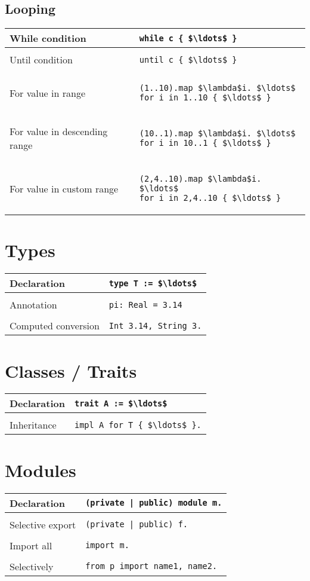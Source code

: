 \documentclass[a4paper,12pt]{article}
\makeatletter
\newcommand{\code}{\lstinline}
\newcommand{\br}{\\ [0.5em] \hline \\ [-0.5em]}
\newenvironment{data}
    {
        \begin{center}
        \begin{tabular*}{\textwidth}{ l@{\extracolsep{\fill}}l }
    }
    {
        \end{tabular*}
        \end{center}
    }
\makeatother
\begin{document}
\subsection{Looping}
\begin{data}
While condition &
    \code[mathescape=true]|while c { $\ldots$ }| \br
Until condition &
    \code[mathescape=true]|until c { $\ldots$ }| \br
For value in range &
    \begin{lstlisting}[mathescape=true]
(1..10).map $\lambda$i. $\ldots$
for i in 1..10 { $\ldots$ }
    \end{lstlisting} \br
For value in descending range &
    \begin{lstlisting}[mathescape=true]
(10..1).map $\lambda$i. $\ldots$
for i in 10..1 { $\ldots$ }
    \end{lstlisting} \br
For value in custom range &
    \begin{lstlisting}[mathescape=true]
(2,4..10).map $\lambda$i. $\ldots$
for i in 2,4..10 { $\ldots$ }
    \end{lstlisting}
\end{data}


\section{Types}
\begin{data}
    Declaration         & \code[mathescape=true]|type T := $\ldots$| \br
    Annotation          & \code|pi: Real = 3.14| \br
    Computed conversion & \code|Int 3.14, String 3.|
\end{data}


\section{Classes / Traits}
\begin{data}
    Declaration & \code[mathescape=true]|trait A := $\ldots$| \br
    Inheritance & \code[mathescape=true]|impl A for T { $\ldots$ }.|
\end{data}


\section{Modules}
\begin{data}
    Declaration      & \code$(private | public) module m.$ \br
    Selective export & \code$(private | public) f.$        \br
    Import all       & \code|import m.|                    \br
    Selectively      & \code|from p import name1, name2.|
\end{data}





\newpage


\end{document}
